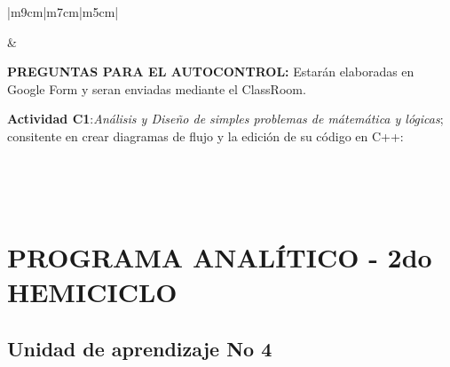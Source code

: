 \documentclass[a4pa<per,12pt,spanish]{article}
\begin{document}
\begin{tabular}[H]{|m{9cm}|m{7cm}|m{5cm}|}
\begin{minipage}[H]{1.0\linewidth}
{\begin{enumerate}
    \end{enumerate}}
  \vspace{0.2cm}
  \end{minipage}


                     &

  \begin{minipage}[H]{1.0\linewidth}

     \textbf{PREGUNTAS PARA EL AUTOCONTROL:} Estarán elaboradas en Google Form y seran enviadas mediante el ClassRoom.
    \vspace{0.8cm}

     \colorbox{green!30}{\parbox[t]{2in}{ \textbf{Actividad C1}:\textit{Análisis y Diseño de simples problemas de mátemática y  lógicas};  consitente en crear diagramas de flujo y la  edición de su código en C++:}} \\
    
  \end{minipage}

  \\ \hline

\end{tabular}

\newpage
\section{PROGRAMA ANALÍTICO - 2do HEMICICLO}


\subsection{Unidad de aprendizaje No 4}
\label{sec:unid-de-aprend4}
\end{document}
